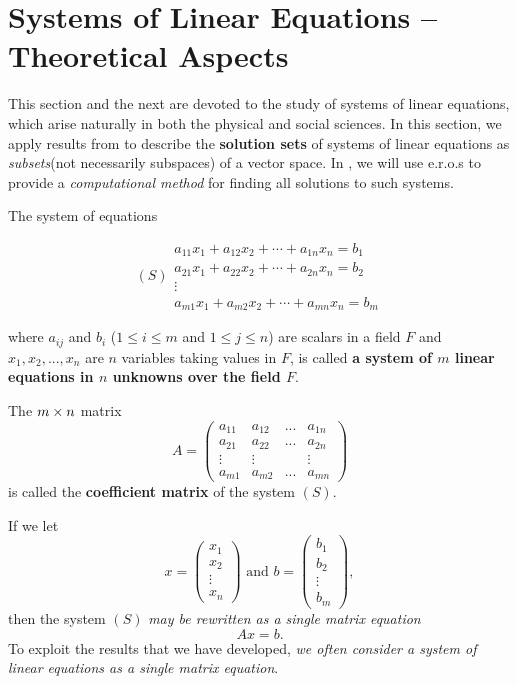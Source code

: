 \section{Systems of Linear Equations -- Theoretical Aspects} \label{sec 3.3}

This section and the next are devoted to the study of systems of linear equations, which arise naturally in both the physical and social sciences.
In this section, we apply results from  to describe the \textbf{solution sets} of systems of linear equations as \emph{subsets}(not necessarily subspaces) of a vector space.
In , we will use e.r.o.s to provide a \emph{computational method} for finding all solutions to such systems.

\begin{additional definition} \label{adef 3.1}
The system of equations

\[
(S)
\begin{array}{c}
a_{11} x_{1}+a_{12} x_{2}+\cdots+a_{1 n} x_{n}=b_{1} \\
a_{21} x_{1}+a_{22} x_{2}+\cdots+a_{2 n} x_{n}=b_{2} \\
\vdots \\
a_{m 1} x_{1}+a_{m 2} x_{2}+\cdots+a_{m n} x_{n}=b_{m}
\end{array}
\]

where \(a_{ij}\) and  \(b_{i}\) (\(1 \le i \le m\) and \(1 \le j \le n\)) are scalars in a field \(F\) and \(x_1, x_2, ..., x_n\) are \(n\) variables taking values in \(F\), is called \textbf{a system of \(m\) linear equations in \(n\) unknowns over the field \(F\)}.

The \(m \times n\) matrix
\[
    A = \left(\begin{array}{cccc}
        a_{11} & a_{12} & ... & a_{1 n} \\
        a_{21} & a_{22} & ... & a_{2 n} \\
        \vdots & \vdots & & \vdots \\
        a_{m 1} & a_{m 2} & ... & a_{m n}
    \end{array}\right)
\]
is called the \textbf{coefficient matrix} of the system \((S)\).

If we let
\[
    x = \left(\begin{array}{c} x_{1} \\ x_{2} \\ \vdots \\ x_{n} \end{array}\right)
    \text { and }
    b = \left(\begin{array}{c} b_{1} \\ b_{2} \\ \vdots \\ b_{m} \end{array}\right),
\]
then the system \((S)\) \emph{may be rewritten as a single matrix equation}
\[
    A x = b.
\]
To exploit the results that we have developed, \emph{we often consider a system of linear equations as a single matrix equation}.


\end{additional definition}

